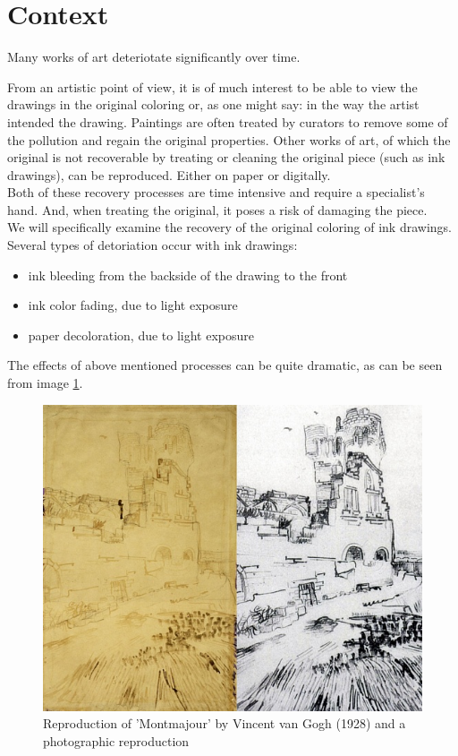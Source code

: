 \section{Context}

	Many works of art deteriotate significantly over time.

	From an artistic point of view, it is of much interest to be able to view the drawings
	in the original coloring or, as one might say: in the way the artist intended the drawing.
	Paintings are often treated by curators to remove some of the pollution and regain
	the original properties.  Other works of art, of which the original is not recoverable by
	treating or cleaning the original piece (such as ink drawings), can be reproduced.
	Either on paper or digitally. \\

	Both of these recovery processes are time intensive and require a specialist's hand.
	And, when treating the original, it poses a risk of damaging the piece. \\

	We will specifically examine the recovery of the original coloring of ink drawings.
	Several types of detoriation occur with ink drawings:

	\begin{itemize}
		\item ink bleeding from the backside of the drawing to the front
		\item ink color fading, due to light exposure
		\item paper decoloration, due to light exposure
	\end{itemize}

	The effects of above mentioned processes can be quite dramatic, as can be seen from
	image \ref{montmajour}.

	\begin{figure}[h!]
		\label{montmajour}
		\includegraphics[width=\columnwidth]{graphics/montmajour}
		\caption{Reproduction of 'Montmajour' by Vincent van Gogh (1928) and a photographic reproduction}
	\end{figure}

